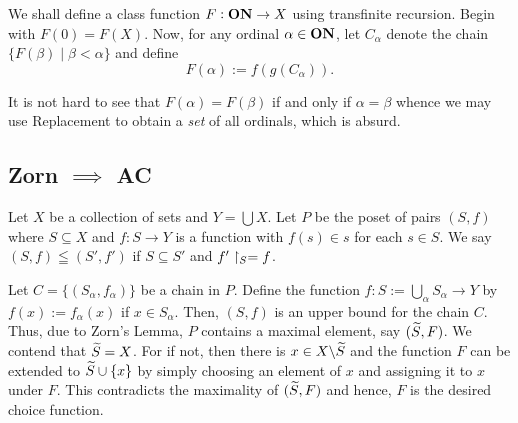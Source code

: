 We shall define a class function $F:\mathbf{ON}\to X$ using transfinite recursion. Begin with $F(0) = F(X)$. Now, for any ordinal $\alpha\in\mathbf{ON}$, let $C_\alpha$ denote the chain $\{F(\beta)\mid \beta < \alpha\}$ and define 
\begin{equation*}
    F(\alpha) := f(g(C_\alpha)).
\end{equation*}

It is not hard to see that $F(\alpha) = F(\beta)$ if and only if $\alpha = \beta$ whence we may use Replacement to obtain a \emph{set} of all ordinals, which is absurd.

\subsection*{Zorn \texorpdfstring{$\implies$}{} AC}

Let $X$ be a collection of sets and $Y = \bigcup X$. Let $P$ be the poset of pairs $(S, f)$ where $S\subseteq X$ and $f: S\to Y$ is a function with $f(s)\in s$ for each $s\in S$. We say $(S, f)\leqq(S',f')$ if $S\subseteq S'$ and $f'\upharpoonright_S = f$. 

Let $C = \{(S_\alpha, f_\alpha)\}$ be a chain in $P$. Define the function $f:S := \bigcup_{\alpha} S_\alpha\to Y$ by $f(x) := f_\alpha(x)$ if $x\in S_\alpha$. Then, $(S, f)$ is an upper bound for the chain $C$. Thus, due to Zorn's Lemma, $P$ contains a maximal element, say $(\widetilde{S}, F)$. We contend that $\widetilde{S} = X$. For if not, then there is $x\in X\backslash\widetilde{S}$ and the function $F$ can be extended to $\widetilde{S}\cup\{x\}$ by simply choosing an element of $x$ and assigning it to $x$ under $F$. This contradicts the maximality of $(\widetilde{S}, F)$ and hence, $F$ is the desired choice function.
